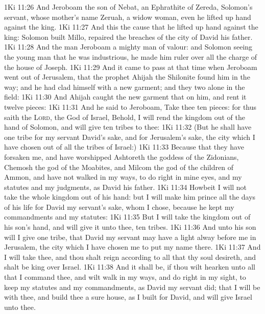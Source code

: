 \vs 1Ki 11:26 And Jeroboam the son of Nebat, an Ephrathite of Zereda, Solomon's servant, whose mother's name  Zeruah, a widow woman, even he lifted up  hand against the king.
\vs 1Ki 11:27 And this  the cause that he lifted up  hand against the king: Solomon built Millo,  repaired the breaches of the city of David his father.
\vs 1Ki 11:28 And the man Jeroboam  a mighty man of valour: and Solomon seeing the young man that he was industrious, he made him ruler over all the charge of the house of Joseph.
\vs 1Ki 11:29 And it came to pass at that time when Jeroboam went out of Jerusalem, that the prophet Ahijah the Shilonite found him in the way; and he had clad himself with a new garment; and they two  alone in the field:
\vs 1Ki 11:30 And Ahijah caught the new garment that  on him, and rent it  twelve pieces:
\vs 1Ki 11:31 And he said to Jeroboam, Take thee ten pieces: for thus saith the \textsc{Lord}, the God of Israel, Behold, I will rend the kingdom out of the hand of Solomon, and will give ten tribes to thee:
\vs 1Ki 11:32 (But he shall have one tribe for my servant David's sake, and for Jerusalem's sake, the city which I have chosen out of all the tribes of Israel:)
\vs 1Ki 11:33 Because that they have forsaken me, and have worshipped Ashtoreth the goddess of the Zidonians, Chemosh the god of the Moabites, and Milcom the god of the children of Ammon, and have not walked in my ways, to do  right in mine eyes, and  my statutes and my judgments, as  David his father.
\vs 1Ki 11:34 Howbeit I will not take the whole kingdom out of his hand: but I will make him prince all the days of his life for David my servant's sake, whom I chose, because he kept my commandments and my statutes:
\vs 1Ki 11:35 But I will take the kingdom out of his son's hand, and will give it unto thee,  ten tribes.
\vs 1Ki 11:36 And unto his son will I give one tribe, that David my servant may have a light alway before me in Jerusalem, the city which I have chosen me to put my name there.
\vs 1Ki 11:37 And I will take thee, and thou shalt reign according to all that thy soul desireth, and shalt be king over Israel.
\vs 1Ki 11:38 And it shall be, if thou wilt hearken unto all that I command thee, and wilt walk in my ways, and do  right in my sight, to keep my statutes and my commandments, as David my servant did; that I will be with thee, and build thee a sure house, as I built for David, and will give Israel unto thee.
